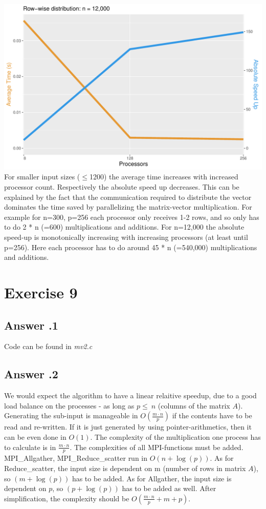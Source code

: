 \documentclass[a4paper,%
11pt,%
DIV=12,
headsepline,%
headings=normal,
]{scrartcl}
\newcounter{curex}
\newcommand{\exercise}[1]{\section*{Exercise #1}\setcounter{curex}{#1}}
\newcommand{\answer}[1]{\subsection*{Answer \arabic{curex}.#1}}
\begin{document}
\includegraphics[scale=0.4,page=1]{../plots/matrix_vector_plot_Row-wise-distribution_12000} \\

For smaller input sizes ($\leq$1200) the average time increases with increased processor count. Respectively the absolute speed up decreases. This can be explained by the fact that the communication required to distribute the vector dominates the time saved by parallelizing the matrix-vector multiplication. For example for n=300, p=256 each processor only receives 1-2 rows, and so only has to do 2 * n (=600) multiplications and additions. For n=12,000 the absolute speed-up is monotonically increasing with increasing processors (at least until p=256). Here each processor has to do around 45 * n (=540,000) multiplications and additions.

\exercise{9}

\answer{1}
Code can be found in \textit{mv2.c}
\answer{2}
We would expect the algorithm to have a linear relaitive speedup, due to a good load balance on the processes - as long as $p \leq\ n$  (columns of the matrix $A$). Generating the sub-input is manageable in $O\left(\frac{m \cdot n}{p}\right)$ if the contents have to be read and re-written. If it is just generated by using pointer-arithmetics, then  it can be even done in $O\left(1\right)$. The complexity of the multiplication one process has to calculate is in $\frac{m \cdot n}{p}$. The complexities of all MPI-functions must be added. MPI\_Allgather,  MPI\_Reduce\_scatter run in $O(n + \log(p))$. As for Reduce\_scatter, the input size is dependent on m (number of rows in matrix $A$), so $(m + \log(p))$ has to be added. As for Allgather, the input size is dependent on $p$, so $(p + \log(p))$ has to be added as well. After simplification, the complexity should be $O\left(\frac{m \cdot n}{p} + m + p\right)$.\\
\end{document}
